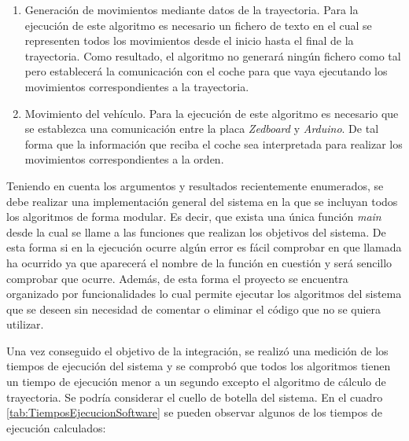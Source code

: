 \begin{enumerate}
\item Generación de movimientos mediante datos de la trayectoria. Para la ejecución de este algoritmo es necesario un fichero de texto en el cual se representen todos los movimientos desde el inicio hasta el final de la trayectoria. Como resultado, el algoritmo no generará ningún fichero como tal pero establecerá la comunicación con el coche para que vaya ejecutando los movimientos correspondientes a la trayectoria.
\item Movimiento del vehículo. Para la ejecución de este algoritmo es necesario que se establezca una comunicación entre la placa \emph{Zedboard} y \emph{Arduino}. De tal forma que la información que reciba el coche sea interpretada para realizar los movimientos correspondientes a la orden.
\end{enumerate}

Teniendo en cuenta los argumentos y resultados recientemente enumerados, se debe realizar una implementación general del sistema en la que se incluyan todos los algoritmos de forma modular. Es decir, que exista una única función \textit{main} desde la cual se llame a las funciones que realizan los objetivos del sistema. De esta forma si en la ejecución ocurre algún error es fácil comprobar en que llamada ha ocurrido ya que aparecerá el nombre de la función en cuestión y será sencillo comprobar que ocurre. Además, de esta forma el proyecto se encuentra organizado por funcionalidades lo cual permite ejecutar los algoritmos del sistema que se deseen sin necesidad de comentar o eliminar el código que no se quiera utilizar.

Una vez conseguido el objetivo de la integración, se realizó una medición de los tiempos de ejecución del sistema y se comprobó que todos los algoritmos tienen un tiempo de ejecución menor a un segundo excepto el algoritmo de cálculo de trayectoria. Se podría considerar el cuello de botella del sistema. En el cuadro \ref{tab:TiemposEjecucionSoftware} se pueden observar algunos de los tiempos de ejecución calculados:

